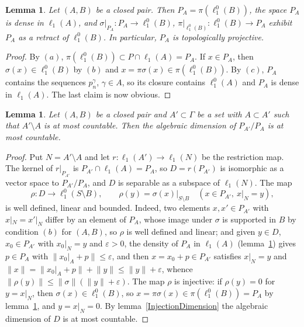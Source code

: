 \documentclass[12pt]{article}
\newtheorem{lemma}[theorem]{Lemma}
\newcommand{\lo}[1]{\ell_1^0(#1)}
\newcommand{\ellone}[1]{\ell_1(#1)}
\newcommand{\norm}[1]{\lVert #1\rVert}
\begin{document}
\begin{lemma}\label{ClosedPairProps} Let $(A,B)$ be a closed pair. Then
    $P_A=\pi(\lo{B})$, the space $P_A$ is dense in $\ellone{A}$, and
    $\sigma|_{P_A}:P_A\to\lo{B}$, $\pi|_{\lo{B}}:\lo{B}\to P_A$ exhibit $P_A$ as
    a retract of $\lo{B}$. In particular, $P_A$ is topologically projective.
\end{lemma}
\begin{proof} By $(a)$, $\pi(\lo{B})\subset P\cap\ellone{A}=P_A$. If $x\in P_A$,
    then $\sigma(x)\in\lo{B}$ by $(b)$ and $x=\pi\sigma(x)\in\pi(\lo{B})$. By
    $(c)$, $P_A$ contains the sequences $p^\gamma_n$, $\gamma\in A$, so its
    closure contains $\lo{A}$ and $P_A$ is dense in $\ellone{A}$. The last
    claim is now obvious.
\end{proof}

\begin{lemma}\label{CountableQuotient} Let $(A,B)$ be a closed pair and
    $A'\subset\Gamma$ be a set with $A\subset A'$ such that $A'\setminus A$
    is at most countable. Then the algebraic dimension of $P_{A'}/P_A$ is at
    most countable.
\end{lemma}
\begin{proof} Put $N=A'\setminus A$ and let $r:\ellone{A'}\to\ellone{N}$ be
    the restriction map. The kernel of $r|_{P_{A'}}$ is $P_{A'}\cap\ellone{A}=P_A$,
    so $D=r(P_{A'})$ is isomorphic as a vector space to $P_{A'}/P_A$, and $D$
    is separable as a subspace of $\ellone{N}$. The map
    \[
    \rho:D\to\lo{S\setminus B},\qquad\rho(y)=\sigma(x)|_{S\setminus B}
    \quad(x\in P_{A'},\ x|_N=y),
    \]
    is well defined, linear and bounded. Indeed, two elements $x,x'\in P_{A'}$
    with $x|_N=x'|_N$ differ by an element of $P_A$, whose image under
    $\sigma$ is supported in $B$ by condition $(b)$ for $(A,B)$, so $\rho$ is
    well defined and linear; and given $y\in D$, $x_0\in P_{A'}$ with
    $x_0|_N=y$ and $\varepsilon>0$, the density of $P_A$ in $\ellone{A}$
    (lemma~\ref{ClosedPairProps}) gives $p\in P_A$ with
    $\norm{x_0|_A+p}\leq\varepsilon$, and then $x=x_0+p\in P_{A'}$ satisfies
    $x|_N=y$ and $\norm{x}=\norm{x_0|_A+p}+\norm{y}\leq\norm{y}+\varepsilon$,
    whence $\norm{\rho(y)}\leq\norm{\sigma}(\norm{y}+\varepsilon)$. The map
    $\rho$ is injective: if $\rho(y)=0$ for $y=x|_N$, then
    $\sigma(x)\in\lo{B}$, so $x=\pi\sigma(x)\in\pi(\lo{B})=P_A$ by
    lemma~\ref{ClosedPairProps}, and $y=x|_N=0$. By
    lemma~\ref{InjectionDimension} the algebraic dimension of $D$ is at most
    countable.
\end{proof}
\end{document}
